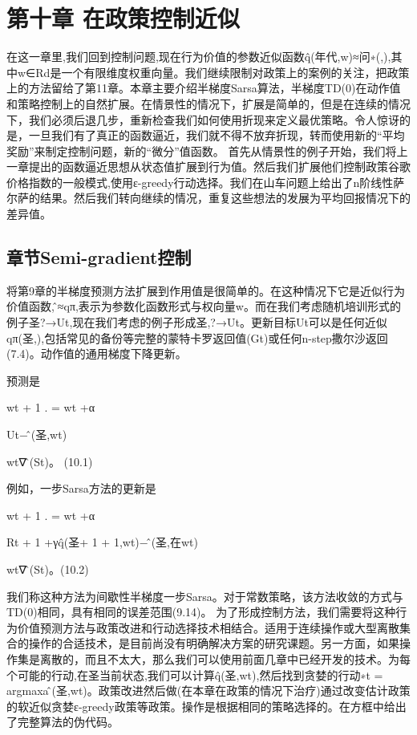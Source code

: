 \chapter{第十章 在政策控制近似}
\begin{summary}
	在这一章里,我们回到控制问题,现在行为价值的参数近似函数q̂(年代,w)≈问∗(,),其中w∈Rd是一个有限维度权重向量。我们继续限制对政策上的案例的关注，把政策上的方法留给了第11章。本章主要介绍半梯度Sarsa算法，半梯度TD(0)在动作值和策略控制上的自然扩展。在情景性的情况下，扩展是简单的，但是在连续的情况下，我们必须后退几步，重新检查我们如何使用折现来定义最优策略。令人惊讶的是，一旦我们有了真正的函数逼近，我们就不得不放弃折现，转而使用新的“平均奖励”来制定控制问题，新的“微分”值函数。
	首先从情景性的例子开始，我们将上一章提出的函数逼近思想从状态值扩展到行为值。然后我们扩展他们控制政策谷歌价格指数的一般模式,使用ε-greedy行动选择。我们在山车问题上给出了n阶线性萨尔萨的结果。然后我们转向继续的情况，重复这些想法的发展为平均回报情况下的差异值。
\end{summary}

\section{章节Semi-gradient控制}
将第9章的半梯度预测方法扩展到作用值是很简单的。在这种情况下它是近似行为价值函数,问̂≈qπ,表示为参数化函数形式与权向量w。而在我们考虑随机培训形式的例子圣?→Ut,现在我们考虑的例子形成圣,?→Ut。更新目标Ut可以是任何近似qπ(圣,),包括常见的备份等完整的蒙特卡罗返回值(Gt)或任何n-step撒尔沙返回(7.4)。动作值的通用梯度下降更新。

预测是


wt + 1
.
= wt +α

Ut−问̂(圣,wt)

wt∇问̂(St)。 					(10.1)

例如，一步Sarsa方法的更新是


wt + 1
.
= wt +α

Rt + 1 +γq̂(圣+ 1 + 1,wt)−问̂(圣,在wt)

wt∇问̂(St)。(10.2)

我们称这种方法为间歇性半梯度一步Sarsa。对于常数策略，该方法收敛的方式与TD(0)相同，具有相同的误差范围(9.14)。
为了形成控制方法，我们需要将这种行为价值预测方法与政策改进和行动选择技术相结合。适用于连续操作或大型离散集合的操作的合适技术，是目前尚没有明确解决方案的研究课题。另一方面，如果操作集是离散的，而且不太大，那么我们可以使用前面几章中已经开发的技术。为每个可能的行动,在圣当前状态,我们可以计算q̂(圣,wt),然后找到贪婪的行动∗t = argmaxa问̂(圣,wt)。政策改进然后做(在本章在政策的情况下治疗)通过改变估计政策的软近似贪婪ε-greedy政策等政策。操作是根据相同的策略选择的。在方框中给出了完整算法的伪代码。
 

